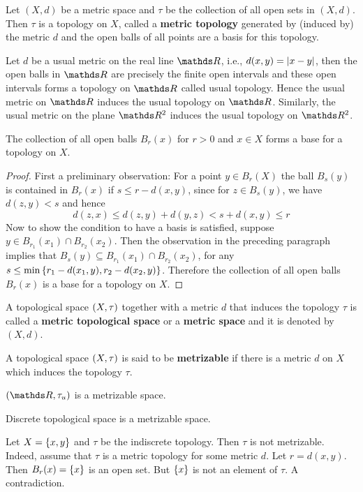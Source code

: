 \documentclass[../main-sheet.tex]{subfiles}
\begin{document}
Let \((X,d)\) be a metric space and \(\tau\) be the collection of all open sets in \((X,d)\). Then \(\tau\) is a topology on \(X\), called a \textbf{metric topology} generated by (induced by) the metric \(d\) and the open balls of all points are a basis for this topology.
\begin{ex}
    Let \(d\) be a usual metric on the real line \(\R\), i.e., \(d(x,y)=\left\vert x-y\right\vert\), then the open balls in \(\R\) are precisely the finite open intervals and these open intervals forms a topology on \(\R\) called usual topology. Hence the usual metric on \(\R\) induces the usual topology on \(\R\). Similarly, the usual metric on the plane \(\R^2\) induces the usual topology on \(\R^2\).
\end{ex}
\begin{prop}
    The collection of all open balls \(B_r(x)\) for \(r>0\) and \(x\in X\) forms a base for a topology on   \(X\).
\end{prop}
\begin{proof}
    First a preliminary observation: For a point \(y\in B_r(X)\) the ball \(B_s(y)\) is contained in \(B_r(x)\) if \(s\leq r-d(x,y)\), since for \(z\in B_s(y)\), we have \(d(z,y)<s\) and hence
    \[d(z,x)\leq d(z,y)+d(y,z)<s+d(x,y)\leq r\]
    Now to show the condition to have a basis is satisfied, suppose \(y\in B_{r_1}(x_1)\cap B_{r_2}(x_2)\). Then the observation in the preceding paragraph implies that \(B_s(y)\subseteq B_{r_1}(x_1)\cap B_{r_2}(x_2)\), for any 
    \(s\leq \min\left\{r_1-d(x_1,y),r_2-d(x_2,y)\right\}\). Therefore the collection of all open balls \(B_r(x)\) is a base for a topology on \(X\).
\end{proof}
A topological space \((X, \tau)\) together with a metric \(d\) that induces the topology \(\tau \) is called  a \textbf{metric topological space} or a \textbf{metric space} and it is denoted by \((X,d)\).
\begin{defn}
    A topological space \((X, \tau) \) is said to be \textbf{metrizable} if there is a metric \(d\) on \(X\) which induces the topology \(\tau\).
\end{defn}
\begin{ex}
    \((\R,\tau_u)\) is a metrizable space.
\end{ex}
\begin{ex}
    Discrete topological space is a metrizable space.
\end{ex}
\begin{ex}
     Let \(X=\left\{x,y\right\}\) and \(\tau\) be the indiscrete topology. Then \(\tau\) is not metrizable. Indeed, assume that \(\tau\) is a metric topology for some metric \(d\). Let \(r=d(x,y)\). Then  \(B_r(x)=\left\{x\right\}\) is an open set. But \(\left\{x\right\}\) is not an element of \(\tau\). A contradiction.
\end{ex}
\end{document}

